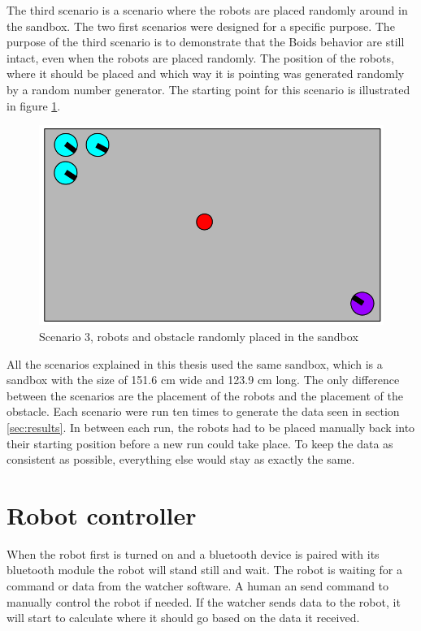 The third scenario is a scenario where the robots are placed randomly around in the sandbox. The two first scenarios were designed for a specific purpose. The purpose of the third scenario is to demonstrate that the Boids behavior are still intact, even when the robots are placed randomly. The position of the robots, where it should be placed and which way it is pointing was generated randomly by a random number generator. The starting point for this scenario is illustrated in figure \ref{fig:scenario2}.
\begin{figure}[h]
\begin{center}
\includegraphics[width=0.8\linewidth]{figs/scenario1}
\end{center}
\caption[scenario 3]{Scenario 3, robots and obstacle randomly placed in the sandbox}
\label{fig:scenario2}
\end{figure}

All the scenarios explained in this thesis used the same sandbox, which is a sandbox with the size of 151.6 cm wide and 123.9 cm long. The only difference between the scenarios are the placement of the robots and the placement of the obstacle. Each scenario were run ten times to generate the data seen in section \ref{sec:results}.
In between each run, the robots had to be placed manually back into their starting position before a new run could take place. To keep the data as consistent as possible, everything else would stay as exactly the same.

\section{Robot controller}
When the robot first is turned on and a bluetooth device is paired with its bluetooth module the robot will stand still and wait. The robot is waiting for a command or data from the watcher software. A human an send command to manually control the robot if needed. If the watcher sends data to the robot, it will start to calculate where it should go based on the data it received. 

